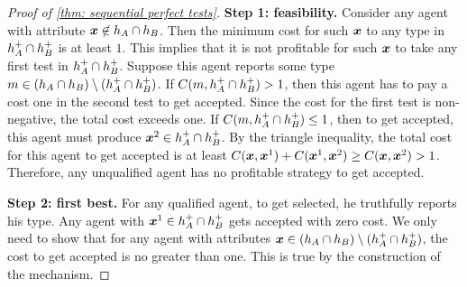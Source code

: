 \begin{proof}[Proof of \cref{thm: sequential perfect tests}]
    \textbf{Step 1: feasibility.}  Consider any agent with attribute $\boldsymbol{x} \not \in h_A \cap h_B$.
    Then the minimum cost for such $\boldsymbol{x}$ to any type in $h_A^+\cap h_B^+$ is at least $1$.
    This implies that it is not profitable for such $\boldsymbol{x}$ to take any first test in $h_A^+\cap h_B^+$.
    Suppose this agent reports some type $m \in (h_A \cap h_B) \setminus (h_A^+\cap h_B^+)$.  If $C(m, h_A^+\cap h_B^+) > 1$, then this agent has to pay a cost one in the second test to get accepted.  Since the cost for the first test is non-negative, the total cost exceeds one.
    If $C(m, h_A^+\cap h_B^+) \leq 1$, then to get accepted, this agent must produce $\boldsymbol{x}^2 \in h_A^+\cap h_B^+$. By the triangle inequality, the total cost for this agent to get accepted is at least $C(\boldsymbol{x},\boldsymbol{x}^1) + C(\boldsymbol{x}^1,\boldsymbol{x}^2) \geq C(\boldsymbol{x}, \boldsymbol{x}^2) > 1$. Therefore, any unqualified agent has no profitable strategy to get accepted. 

    \textbf{Step 2: first best.} For any qualified agent, to get selected, he  truthfully reports his type.
    Any agent with  $\boldsymbol{x}^1 \in h_A^+\cap h_B^+$ gets accepted with zero cost.
    We only need to show that for  any agent with attributes $\boldsymbol{x} \in (h_A \cap h_B) \setminus (h_A^+\cap h_B^+)$, the cost to get accepted is no greater than one.
    This is true by the construction of the mechanism.
\end{proof}


